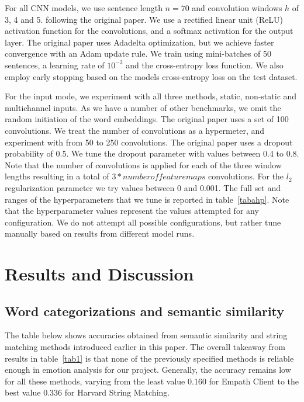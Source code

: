 \documentclass[conference]{IEEEtran}
\begin{document}
For all CNN models, we use sentence length $n = 70$ and convolution windows $h$ of 3, 4 and 5.  following the original paper. We use a rectified linear unit (ReLU) activation function for the convolutions, and a softmax activation for the output layer. The original paper uses Adadelta \cite{adadelta} optimization, but we achieve faster convergence with an Adam \cite{adam} update rule. We train using mini-batches of 50 sentences, a learning rate of $10^{-3}$ and the cross-entropy loss function. We also employ early stopping based on the models cross-entropy loss on the test dataset.

For the input mode, we experiment with all three methods, static, non-static and multichannel inputs. As we have a number of other benchmarks, we omit the random initiation of the word embeddings.  The original paper uses a set of 100 convolutions. We treat the number of convolutions as a hypermeter, and experiment with from 50 to 250 convolutions. The original paper uses a dropout probability of 0.5. We tune the dropout parameter with values between 0.4 to 0.8. Note that the number of convolutions is applied for each of the three window lengths resulting in a total of $3 * number of feature maps$ convolutions. For the $l_2$ regularization parameter we try values between 0 and 0.001. The full set and ranges of the hyperparameters that we tune is reported in table~\ref{tabahp}. Note that the hyperparameter values represent the values attempted for any configuration. We do not attempt all possible configurations, but rather tune manually based on results from different model runs.

\section{Results and Discussion}

\subsection{Word categorizations and semantic similarity}

The table below shows accuracies obtained from semantic similarity and string matching methods introduced earlier in this paper. The overall takeaway from results in table~\ref{tab1} is that none of the previously specified methods is reliable enough in emotion analysis for our project. Generally, the accuracy remains low for all these methods, varying from the least value 0.160 for Empath Client to the best value 0.336 for Harvard String Matching.
\end{document}
